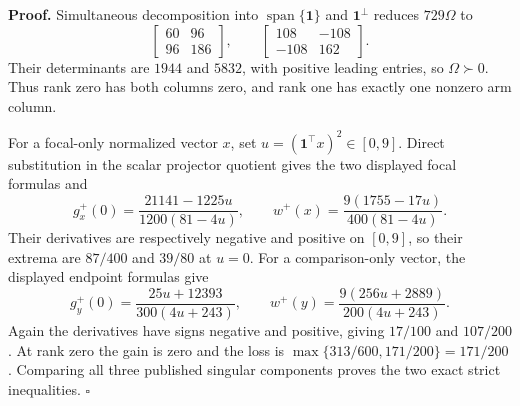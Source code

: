 \textbf{Proof.}
Simultaneous decomposition into \(\operatorname{span}\{\mathbf1\}\) and \(\mathbf1^\perp\) reduces \(729\Omega\) to
\[
\begin{bmatrix}60&96\\96&186\end{bmatrix},
\qquad
\begin{bmatrix}108&-108\\-108&162\end{bmatrix}.
\]
Their determinants are \(1944\) and \(5832\), with positive leading entries, so \(\Omega\succ0\).  Thus rank zero has both columns zero, and rank one has exactly one nonzero arm column.

For a focal-only normalized vector \(x\), set \(u=(\mathbf1^\top x)^2\in[0,9]\).  Direct substitution in the scalar projector quotient gives the two displayed focal formulas and
\[
g_x^+(0)=\frac{21141-1225u}{1200(81-4u)},
\qquad
w^+(x)=\frac{9(1755-17u)}{400(81-4u)}.
\]
Their derivatives are respectively negative and positive on \([0,9]\), so their extrema are \(87/400\) and \(39/80\) at \(u=0\).  For a comparison-only vector, the displayed endpoint formulas give
\[
g_y^+(0)=\frac{25u+12393}{300(4u+243)},
\qquad
w^+(y)=\frac{9(256u+2889)}{200(4u+243)}.
\]
Again the derivatives have signs negative and positive, giving \(17/100\) and \(107/200\).  At rank zero the gain is zero and the loss is \(\max\{313/600,171/200\}=171/200\).  Comparing all three published singular components proves the two exact strict inequalities. \(\square\)